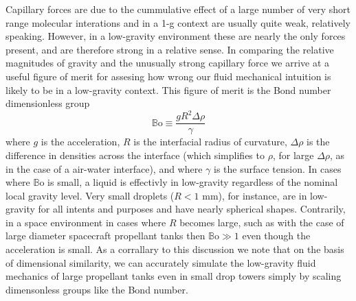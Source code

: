 \documentclass[10pt,a4paper]{article}
\begin{document}
Capillary forces are due to the cummulative effect of a large number of very short range molecular interations and in a 1-g context are usually quite weak, relatively speaking. However, in a low-gravity environment these are nearly the only forces present, and are therefore strong in a relative sense. In comparing the relative magnitudes of gravity and the unusually strong capillary force we arrive at a useful figure of merit for assesing how wrong our fluid mechanical intuition is likely to be in a low-gravity context. This figure of merit is the Bond number dimensionless group
\[ \mathbb{B}\mbox{o} \equiv \frac{g R^2 \Delta \rho}{\gamma} 
\]
where $g$ is the acceleration, $R$ is the interfacial radius of curvature, $\Delta \rho$ is the difference in densities across the interface (which simplifies to $\rho$, for large $\Delta \rho$, as in the case of a air-water interface), and where $\gamma$ is the surface tension. In cases where $\mathbb{B}\mbox{o}$ is small, a liquid is effectivly in low-gravity regardless of the nominal local gravity level. Very small droplets ($R < 1$ mm), for instance, are in low-gravity for all intents and purposes and have nearly spherical shapes. Contrarily, in a space environment in cases where $R$ becomes large, such as with the case of large diameter spacecraft propellant tanks then $ \mathbb{B}\mbox{o} \gg 1$ even though the acceleration is small. As a corrallary to this discussion we note that on the basis of dimensional similarity, we can accurately simulate the low-gravity fluid mechanics of large propellant tanks even in small drop towers simply by scaling dimensonless groups like the Bond number. 
\end{document}
